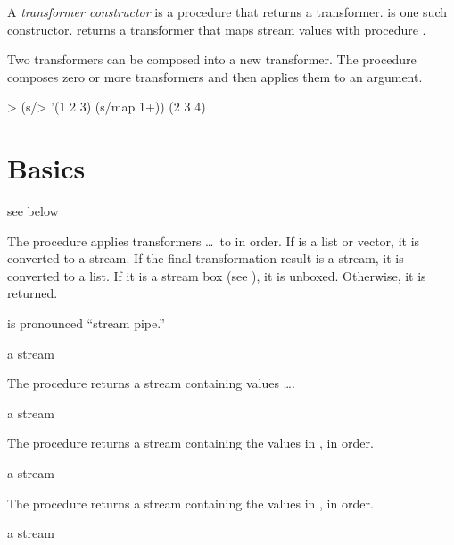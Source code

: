 A \emph{transformer constructor} is a procedure that returns a transformer. 
is one such constructor.  returns a transformer that maps stream values
with procedure .

Two transformers can be composed into a new transformer. The  procedure composes
zero or more transformers and then applies them to an argument.

\codebegin
> (s/> '(1 2 3) (s/map 1+))
(2 3 4)
\codeend

\section {Basics}

\begin{procedure}
\end{procedure}
\returns{} see below

The  procedure applies transformers  \ldots\ to  in order. If
 is a list or vector, it is converted to a stream. If the final
transformation result is a stream, it is converted to a list. If it is a stream
box (see ), it is unboxed. Otherwise, it is returned.

 is pronounced ``stream pipe.''

\begin{procedure}
\end{procedure}
\returns{} a stream

The  procedure returns a stream containing values  \ldots.

\begin{procedure}
\end{procedure}
\returns{} a stream

The  procedure returns a stream containing the values in , in
order.

\begin{procedure}
\end{procedure}
\returns{} a stream

The  procedure returns a stream containing the values in
, in order.

\begin{procedure}
\end{procedure}
\returns{} a stream

